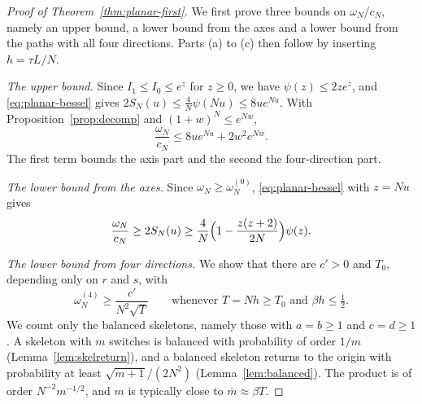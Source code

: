 \begin{proof}[Proof of Theorem~\ref{thm:planar-first}]
We first prove three bounds on $\omega_N/c_N$, namely an upper bound, a lower bound from the axes and a
lower bound from the paths with all four directions. Parts (a) to (c) then follow by inserting
$h=\tau L/N$.

\emph{The upper bound.} Since $I_1\le I_0\le e^z$ for $z\ge0$, we have $\psi(z)\le2ze^z$, and
\eqref{eq:planar-bessel} gives $2S_N(u)\le\frac4N\psi(Nu)\le8ue^{Nu}$. With
Proposition~\ref{prop:decomp} and $(1+w)^N\le e^{Nw}$,
\begin{equation}\label{eq:app-planar-upper}
 \frac{\omega_N}{c_N}\le8ue^{Nu}+2w^2e^{Nw}.
\end{equation}
The first term bounds the axis part and the second the four-direction part.

\emph{The lower bound from the axes.} Since $\omega_N\ge \omega^{(0)}_N$, \eqref{eq:planar-bessel} with
$z=Nu$ gives
\begin{equation}\label{eq:app-planar-axes}
 \frac{\omega_N}{c_N}\ge2S_N(u)\ge\frac4N\Bigl(1-\frac{z(z+2)}{2N}\Bigr)\psi(z).
\end{equation}

\emph{The lower bound from four directions.} We show that there are $c'>0$ and $T_0$, depending
only on $r$ and $s$, with
\begin{equation}\label{eq:app-planar-four}
 \omega^{(4)}_N\ge\frac{c'}{N^2\sqrt T}\qquad\text{whenever }T=Nh\ge T_0\text{ and }\beta h\le\tfrac12 .
\end{equation}
We count only the balanced skeletons, namely those with $a=b\ge1$ and $c=d\ge1$. A skeleton with
$m$ switches is balanced with probability of order $1/m$ (Lemma~\ref{lem:skelreturn}), and a
balanced skeleton returns to the origin with probability at least $\sqrt{m+1}/(2N^2)$
(Lemma~\ref{lem:balanced}). The product is of order $N^{-2}m^{-1/2}$, and $m$ is typically close to
$\bar m\approx\beta T$.


\end{proof}
